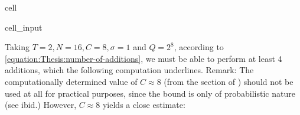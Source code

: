 \documentclass[letterpaper,10pt,english]{jupyterBook}
\begin{document}
\begin{sphinxuseclass}{cell}
\begin{sphinxVerbatimInput}
\begin{sphinxuseclass}{cell_input}
\begin{sphinxVerbatim}[commandchars=\\\{\}]
                
                  
                   
              
     
\end{sphinxVerbatim}

\end{sphinxuseclass}\end{sphinxVerbatimInput}

\end{sphinxuseclass}
\sphinxAtStartPar
Taking \(T=2, N=16, C=8, \sigma = 1\) and \(Q=2^8\), according to \eqref{equation:Thesis:number-of-additions}, we must be able to perform at least 4 additions, which the following computation underlines.
Remark: The computationally determined value of \(C \approx 8\) (from the section of {\hyperref[\detokenize{Thesis:error-after-BFV-encryption}]{}}) should not be used at all for practical purposes, since the bound is only of probabilistic nature (see ibid.)
However, \(C \approx 8\) yields a close estimate:
\end{document}
